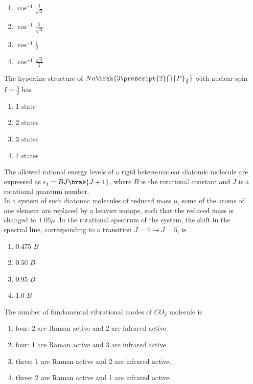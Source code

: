 \begin{multicols}{4}
    \begin{enumerate}
        \item $\cos^{-1}\frac{1}{\sqrt{3}}$
        \item $\cos^{-1}\frac{2}{\sqrt{3}}$
        \item $\cos^{-1}\frac{1}{2}$
        \item $\cos^{-1}\frac{\sqrt{3}}{2}$
    \end{enumerate}
\end{multicols}
\item  The hyperfine structure of $Na\brak{3\prescript{2}{}{P}_\frac{3}{2}}$ with nuclear spin $I=\frac{3}{2}$ has 
\begin{multicols}{4}
   \begin{enumerate}
       \item 1 state 
       \item 2 states
       \item 3 states
       \item 4 states
   \end{enumerate}
\end{multicols}
\item The allowed rational energy levels of a rigid hetero-nuclear diatomic molecule are expressed as $\epsilon_j=BJ\brak{J+1}$, where $B$ is the rotational constant and $J$ is a rotational quantum number.\\ In a system of such diatomic molecules of reduced  mass $\mu$, some of the atoms of one element are replaced by a heavier isotope, such that the reduced mass is changed to $1.05\mu$. In the rotational spectrum of the system, the shift in the spectral line, corresponding to a transition $J=4 \rightarrow J=5$, is 
\begin{multicols}{4}
    \begin{enumerate}
        \item 0.475 $B$
        \item 0.50 $B$
        \item 0.95 $B$
        \item 1.0 $B$
    \end{enumerate}
\end{multicols}
\item The number of fundamental vibrational modes of $CO_2$ molecule is 
\begin{enumerate}
    \item four: 2 are Raman active and 2 are infrared active.
    \item four: 1 are Raman active and 3 are infrared active.
    \item three: 1 are Raman active and 2 are infrared active.
    \item three: 2 are Raman active and 1 are infrared active.
\end{enumerate}
